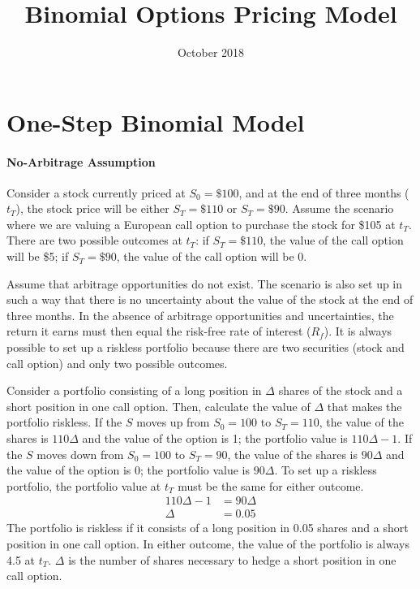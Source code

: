 \documentclass[12pt]{article}
\title{Binomial Options Pricing Model}
\date{October 2018}
\begin{document}
\begin{titlepage}
\maketitle
\end{titlepage}

\section{One-Step Binomial Model}
\paragraph{No-Arbitrage Assumption} \hspace{0pt}

Consider a stock currently priced at $S_{0}=\text{\$100}$, and at the end of three months ($t_{T}$), the stock price will be either $S_{T}=\text{\$110}$ or $S_{T}=\text{\$90}$. Assume the scenario where we are valuing a European call option to purchase the stock for \$105 at $t_{T}$. There are two possible outcomes at $t_{T}$: if $S_{T}=\text{\$110}$, the value of the call option will be \$5; if $S_{T}=\text{\$90}$, the value of the call option will be 0.

Assume that arbitrage opportunities do not exist. The scenario is also set up in such a way that there is no uncertainty about the value of the stock at the end of three months. In the absence of arbitrage opportunities and uncertainties, the return it earns must then equal the risk-free rate of interest ($R_{f}$). It is always possible to set up a riskless portfolio because there are two securities (stock and call option) and only two possible outcomes.

Consider a portfolio consisting of a long position in $\Delta$ shares of the stock and a short position in one call option. Then, calculate the value of $\Delta$ that makes the portfolio riskless. If the $S$ moves up from $S_{0}=100$ to $S_{T}=110$, the value of the shares is $110\Delta$ and the value of the option is 1; the portfolio value is $110\Delta-1$. If the $S$ moves down from $S_{0}=100$ to $S_{T}=90$, the value of the shares is $90\Delta$ and the value of the option is 0; the portfolio value is $90\Delta$. To set up a riskless portfolio, the portfolio value at $t_{T}$ must be the same for either outcome.
\begin{align*}
110\Delta-1&=90\Delta\\
\Delta&=0.05
\end{align*}
The portfolio is riskless if it consists of a long position in 0.05 shares and a short position in one call option. In either outcome, the value of the portfolio is always 4.5 at $t_{T}$. $\Delta$ is the number of shares necessary to hedge a short position in one call option.
\end{document}
